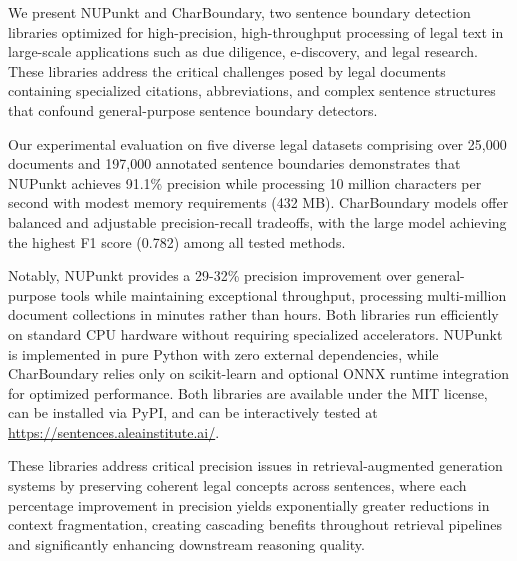 We present NUPunkt and CharBoundary, two sentence boundary detection libraries optimized for high-precision, high-throughput processing of legal text in large-scale applications such as due diligence, e-discovery, and legal research. These libraries address the critical challenges posed by legal documents containing specialized citations, abbreviations, and complex sentence structures that confound general-purpose sentence boundary detectors.

Our experimental evaluation on five diverse legal datasets comprising over 25,000 documents and 197,000 annotated sentence boundaries demonstrates that NUPunkt achieves 91.1\% precision while processing 10 million characters per second with modest memory requirements (432 MB). CharBoundary models offer balanced and adjustable precision-recall tradeoffs, with the large model achieving the highest F1 score (0.782) among all tested methods.

Notably, NUPunkt provides a 29-32\% precision improvement over general-purpose tools while maintaining exceptional throughput, processing multi-million document collections in minutes rather than hours. Both libraries run efficiently on standard CPU hardware without requiring specialized accelerators. NUPunkt is implemented in pure Python with zero external dependencies, while CharBoundary relies only on scikit-learn and optional ONNX runtime integration for optimized performance. Both libraries are available under the MIT license, can be installed via PyPI, and can be interactively tested at \url{https://sentences.aleainstitute.ai/}.

These libraries address critical precision issues in retrieval-augmented generation systems by preserving coherent legal concepts across sentences, where each percentage improvement in precision yields exponentially greater reductions in context fragmentation, creating cascading benefits throughout retrieval pipelines and significantly enhancing downstream reasoning quality.